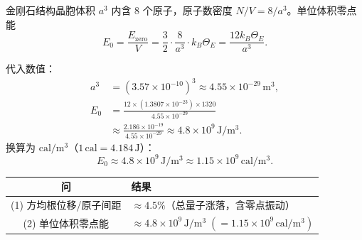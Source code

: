 \begin{derivationbox}[标准解题过程]
金刚石结构晶胞体积 $a^3$ 内含 8 个原子，原子数密度 $N/V=8/a^3$。单位体积零点能
\begin{equation}
\boxed{E_0 = \frac{E_{\text{zero}}}{V} = \frac32\cdot\frac{8}{a^3}\cdot k_B\Theta_E = \frac{12k_B\Theta_E}{a^3}.}
\label{eq:diamond-zero-energy}
\end{equation}

代入数值：
\begin{align}
    a^3 &= (3.57\times10^{-10})^3 \approx 4.55\times10^{-29}\,\mathrm{m^3}, \\
    E_0 &= \frac{12\times(1.3807\times10^{-23})\times1320}{4.55\times10^{-29}} \nonumber\\
    &\approx \frac{2.186\times10^{-19}}{4.55\times10^{-29}} \approx 4.8\times10^9\,\mathrm{J/m^3}.
\end{align}
换算为 $\mathrm{cal/m^3}$（$1\,\mathrm{cal}=4.184\,\mathrm{J}$）：
\begin{equation}
\boxed{E_0 \approx 4.8\times10^9\,\mathrm{J/m^3} \approx 1.15\times10^9\,\mathrm{cal/m^3}.}
\end{equation}
\end{derivationbox}

\begin{formulabox}[答案汇总]
\begin{center}
\begin{tabular}{cl}
\toprule
问 & 结果 \\
\midrule
(1) 方均根位移/原子间距 & $\displaystyle \approx 4.5\%$（总量子涨落，含零点振动） \\[8pt]
(2) 单位体积零点能 & $\displaystyle \approx 4.8\times10^9\,\mathrm{J/m^3}\;(=1.15\times10^9\,\mathrm{cal/m^3})$ \\
\bottomrule
\end{tabular}
\end{center}
\end{formulabox}

